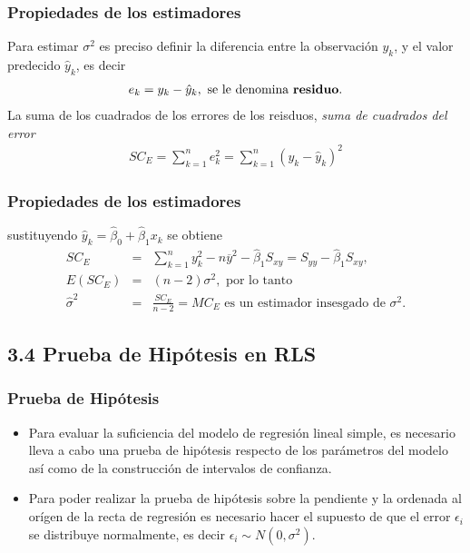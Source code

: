 \documentclass{beamer}
\begin{document}
\begin{frame}\frametitle{Propiedades de los estimadores}
Para estimar $\sigma^{2}$ es preciso definir la diferencia entre la observaci\'on $y_{k}$, y el valor predecido $\hat{y}_{k}$, es decir
\begin{eqnarray*}
e_{k}=y_{k}-\hat{y}_{k},\textrm{ se le denomina \textbf{residuo}.}
\end{eqnarray*}
La suma de los cuadrados de los errores de los reisduos, \textit{suma de cuadrados del error}
\begin{eqnarray}
SC_{E}=\sum_{k=1}^{n}e_{k}^{2}=\sum_{k=1}^{n}\left(y_{k}-\hat{y}_{k}\right)^{2}
\end{eqnarray}
\end{frame}

\begin{frame}\frametitle{Propiedades de los estimadores}
sustituyendo $\hat{y}_{k}=\hat{\beta}_{0}+\hat{\beta}_{1}x_{k}$ se obtiene
\begin{eqnarray*}
SC_{E}&=&\sum_{k=1}^{n}y_{k}^{2}-n\overline{y}^{2}-\hat{\beta}_{1}S_{xy}=S_{yy}-\hat{\beta}_{1}S_{xy},\\
E\left(SC_{E}\right)&=&\left(n-2\right)\sigma^{2},\textrm{ por lo tanto}\\
\hat{\sigma}^{2}&=&\frac{SC_{E}}{n-2}=MC_{E}\textrm{ es un estimador insesgado de }\sigma^{2}.
\end{eqnarray*}
\end{frame}

\subsection{3.4 Prueba de Hip\'otesis en RLS}
\begin{frame}\frametitle{Prueba de Hip\'otesis}
\begin{itemize}
\item Para evaluar la suficiencia del modelo de regresi\'on lineal simple, es necesario lleva a cabo una prueba de hip\'otesis respecto de los par\'ametros del modelo as\'i como de la construcci\'on de intervalos de confianza.

\item Para poder realizar la prueba de hip\'otesis sobre la pendiente y la ordenada al or\'igen de la recta de regresi\'on es necesario hacer el supuesto de que el error $\epsilon_{i}$ se distribuye normalmente, es decir $\epsilon_{i} \sim N\left(0,\sigma^{2}\right)$.

\end{itemize}

\end{frame}
\end{document}
